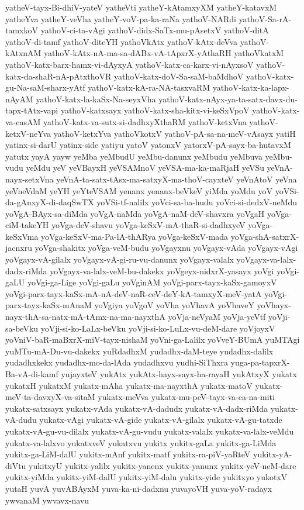 {yatheV-tayx-Bi-dhiV-yateV
yatheVti
yatheY-kAtamxyXM
yatheY-katavxM
yatheYva
yatheY-veVha
yatheY-voV-pa-ka-raNa
yathoV-NARdi
yathoV-Sa-rA-tamxkoV
yathoV-ci-ta-vAgi
yathoV-didx-SaTx-mu-pAsetxV
yathoV-ditA
yathoV-di-tamf
yathoV-diteYH
yathoVkAtx
yathoV-kAtx-deVva
yathoV-kAtxnAM
yathoV-kAtx-nA-ma-sa-dABx-vA-tApxrX-yAthaRH
yathoVkatxM
yathoV-katx-barx-hamx-vi-dAyxyA
yathoV-katx-ca-karx-vi-nAyxsoV
yathoV-katx-da-shaR-nA-pAtxthoVR
yathoV-katx-doV-Sa-saM-baMdhoV
yathoV-katx-gu-Na-saM-sharx-yAtf
yathoV-katx-kA-ra-NA-tasxvaRM
yathoV-katx-ka-lapx-nAyAM
yathoV-katx-la-kaSx-Na-seyxVha
yathoV-katx-nAyx-ya-ta-satx-davx-du-tapx-tAtx-vapi
yathoV-katxsayx
yathoV-katx-sha-kitx-vi-keSxVpoV
yathoV-katx-va-casAM
yathoV-katx-va-sutx-si-dadhxyXthaRM
yathoV-ketxVna
yathoV-ketxV-neYva
yathoV-ketxYva
yathoVkotxV
yathoV-pA-sa-na-meV-vAsayx
yatiH
yatinx-si-darU
yatinx-side
yatiyu
yatoV
yatonxV
yatorxV-pA-sayx-ba-hutavxM
yatutx
yayA
yayw
yeMba
yeMbudU
yeMbu-danunx
yeMbudu
yeMbuva
yeMbu-vudu
yeMdu
yeV
yeVBayxH
yeVSAMnoV
yeVSA-ma-ka-maRjaH
yeVSu
yeVnA-nayx-setxVna
yeVnA-ta-satx-tAsx-ma-satxyX-ma-thoV-cayxteV
yeVnAtoV
yeVna
yeVneVdaM
yeYH
yeYteVSAM
yenanx
yenanx-beVkeV
yiMda
yoMdu
yoV
yoVSi-da-gAnxyX-di-daqSwTX
yoVSi-tf-nalilx
yoVci-sa-ba-hudu
yoVci-si-dedxV-neMdu
yoVgA-BAyx-sa-diMda
yoVgA-naMda
yoVgA-naM-deV-shavxra
yoVgaH
yoVga-ciM-takeYH
yoVga-deV-shavu
yoVga-keSxV-mA-thaR-si-dadhxyeV
yoVga-keSxVma
yoVga-keSxV-ma-Pa-lA-thARya
yoVga-keSxV-mada
yoVga-shA-satxrX-jacnxru
yoVga-shakitx
yoVga-veM-budu
yoVgayxnu
yoVgayx-vAda
yoVgayx-vAgi
yoVgayx-vA-gilalx
yoVgayx-vA-gi-ru-vu-danunx
yoVgayx-valalx
yoVgayx-va-lalx-dadx-riMda
yoVgayx-va-lalx-veM-bu-dakekx
yoVgeyx-nidxrX-yasayx
yoVgi
yoVgi-gaLU
yoVgi-ga-Lige
yoVgi-gaLu
yoVginAM
yoVgi-parx-tayx-kaSx-gamoyxV
yoVgi-parx-tayx-kaSx-mA-nA-deV-naR-ceV-deY-kA-tamxyX-meV-yatA
yoVgi-parx-tayx-kaSx-mAnaM
yoVgiya
yoVgoV
yoVha
yoVhavA
yoVhaveY
yoVhayx-nayx-thA-sa-natx-mA-tAmx-na-ma-nayxthA
yoVja-neVyaM
yoVja-yeVtf
yoVji-sa-beVku
yoVji-si-ko-LaLx-beVku
yoVji-si-ko-LuLx-vu-deM-dare
yoVjoyxV
yoVniV-baR-maBxrX-miV-tayx-nishaM
yoVni-ga-Lalilx
yoVveY-BUmA
yuMTAgi
yuMTu-mA-Du-vu-dakekx
yuRdadhxM
yudadhx-daM-teye
yudadhx-dalilx
yudadhxkekx
yudadhx-mo-da-lAda
yudadhxvu
yudhi-SiThxra
yuga-pa-tapxrX-Ba-vA-di-kamf
yujayxteV
yukAtx
yukAtx-hayx-sayx-ha-rayaH
yukAtxyX
yukatx
yukatxH
yukatxM
yukatx-mAha
yukatx-ma-nayxthA
yukatx-matoV
yukatx-meV-ta-davxyX-va-sitaM
yukatx-meVva
yukatx-mu-peV-tayx-va-ca-na-miti
yukatx-satxsayx
yukatx-vAda
yukatx-vA-dadudx
yukatx-vA-dadx-riMda
yukatx-vA-dudu
yukatx-vAgi
yukatx-vA-gide
yukatx-vA-gilalx
yukatx-vA-gu-tatxde
yukatx-vA-gu-vu-dilalx
yukatx-vA-gu-vudu
yukatx-valalx
yukatx-va-lalx-veMdu
yukatx-va-lalxvo
yukatxveV
yukatxvu
yukitx
yukitx-gaLa
yukitx-ga-LiMda
yukitx-ga-LiM-dalU
yukitx-mAnf
yukitx-matf
yukitx-ra-piV-yaRteV
yukitx-yA-diVtu
yukitxyU
yukitx-yalilx
yukitx-yanenx
yukitx-yanunx
yukitx-yeV-neM-dare
yukitx-yiMda
yukitx-yiM-dalU
yukitx-yiM-dalu
yukitx-yide
yukitxyo
yukotxV
yutaH
yuvA
yuvABAyxM
yuva-ka-ni-dadxnu
yuvayoVH
yuva-yoV-radayx
ywvanaM
ywvavx-navu
}
